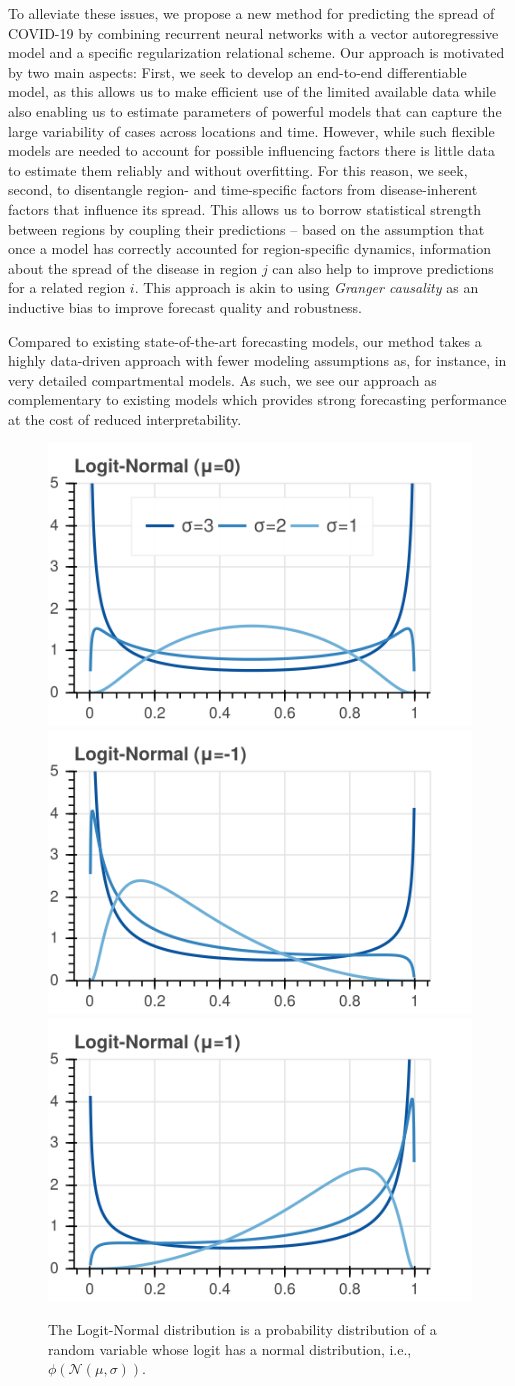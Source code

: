 \documentclass{article}
\begin{document}
To alleviate these issues, we propose a new method for predicting the spread of
COVID-19 by combining recurrent neural networks with a vector autoregressive
model and a specific regularization relational scheme. Our approach is motivated
by two main aspects: First, we seek to develop an end-to-end differentiable
model, as this allows us to make efficient use of the limited available data
while also enabling us to estimate parameters of powerful models that can capture
the large variability of cases across locations and time. However, while such
flexible models are needed to account for possible influencing factors there
is little data to estimate them reliably and without overfitting. For this
reason, we seek, second, to disentangle region- and time-specific factors from
disease-inherent factors that influence its spread. This allows us to borrow
statistical strength between regions by coupling their predictions -- based on
the assumption that once a model has correctly accounted for region-specific
dynamics, information about the spread of the disease in region \(j\) can
also help to improve predictions for a related region \(i\). This
approach is akin to using \emph{Granger causality} as an inductive bias to improve
forecast quality and robustness.

Compared to existing state-of-the-art forecasting models, our method takes a
highly data-driven approach with fewer modeling assumptions as, for instance, in
very detailed compartmental models. As such, we see our approach as complementary
to existing models which provides strong forecasting performance at the cost of
reduced interpretability.



\begin{figure}[t]\centering
\includegraphics[width=.25\textwidth]{img/logit_normal_0.png}\hspace{1em}
\includegraphics[width=.25\textwidth]{img/logit_normal_-1.png}\hspace{1em}
\includegraphics[width=.25\textwidth]{img/logit_normal_1.png}
\caption{The Logit-Normal distribution is a probability distribution of a random variable whose logit has a normal distribution, i.e., $\phi(\mathcal{N}(\mu, \sigma))$.}
\end{figure}
\end{document}
